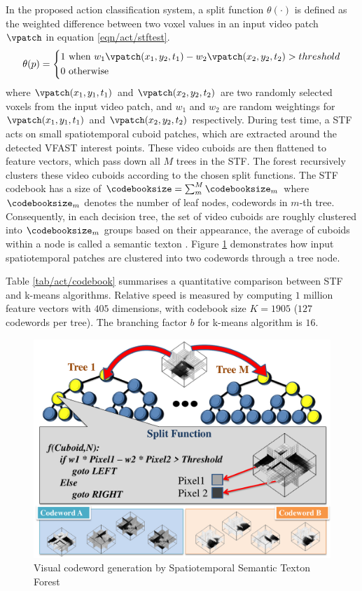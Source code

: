 In the proposed action classification system, a split function $\theta(\cdot)$ is defined as the weighted difference between two voxel values in an input video patch $\vpatch$ in equation \ref{eqn/act/stftest}. 
\begin{equation}
	\theta(p) = 
	\left\{
		\begin{aligned}
			1 & \mbox{ when } w_1 \vpatch(x_1,y_2,t_1) - w_2 \vpatch(x_2,y_2,t_2) > threshold \\  
			0 & \mbox{ otherwise } 
		\end{aligned}
	\right.
	\label{eqn/act/stftest}
\end{equation}
where $\vpatch(x_1, y_1, t_1)$ and $\vpatch(x_2, y_2, t_2)$ are two randomly selected voxels from the input video patch, and $w_1$ and $w_2$ are random weightings for $\vpatch(x_1,y_1,t_1)$ and $\vpatch(x_2,y_2,t_2)$ respectively. 
During test time, a STF acts on small spatiotemporal cuboid patches, which are extracted around the detected VFAST interest points. These video cuboids are then flattened to feature vectors, which pass down all $M$ trees in the STF. 
The forest recursively clusters these video cuboids according to the chosen split functions.  
The STF codebook has a size of $\codebooksize=\sum_m^M \codebooksize_m$ where $\codebooksize_m$ denotes the number of leaf nodes, \ie codewords in $m$-th tree. 
Consequently, in each decision tree, the set of video cuboids are roughly clustered into $\codebooksize_m$ groups based on their appearance, the average of cuboids within a node is called a semantic texton \cite{Shotton2008}. 
Figure \ref{fig/act/stf} demonstrates how input spatiotemporal patches are clustered into two codewords through a tree node. 

Table \ref{tab/act/codebook} summarises a quantitative comparison between STF and k-means algorithms. Relative speed is measured by computing $1$ million feature vectors with $405$ dimensions, with codebook size $K = 1905$ ($127$ codewords per tree). The branching factor $b$ for k-means algorithm is $16$.

\begin{figure}[ht]
	\centering 
	\includegraphics[width=0.8\linewidth]{fig/act/stf_new.pdf} 
	\caption{Visual codeword generation by Spatiotemporal Semantic Texton Forest}
	\label{fig/act/stf}
\end{figure}

